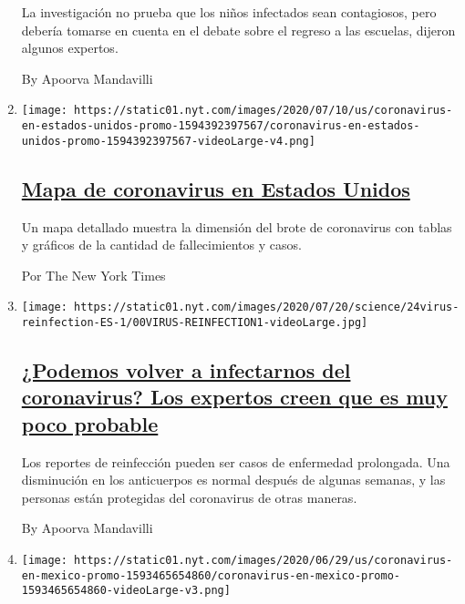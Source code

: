 \begin{enumerate}
  La investigación no prueba que los niños infectados sean contagiosos,
  pero debería tomarse en cuenta en el debate sobre el regreso a las
  escuelas, dijeron algunos expertos.

  By Apoorva Mandavilli
\item
  \texttt{[image: https://static01.nyt.com/images/2020/07/10/us/coronavirus-en-estados-unidos-promo-1594392397567/coronavirus-en-estados-unidos-promo-1594392397567-videoLarge-v4.png]}

  \hypertarget{mapa-de-coronavirus-en-estados-unidos}{%
  \subsection{\texorpdfstring{\href{/es/interactive/2020/espanol/mundo/coronavirus-en-estados-unidos.html}{Mapa
  de coronavirus en Estados
  Unidos}}{Mapa de coronavirus en Estados Unidos}}\label{mapa-de-coronavirus-en-estados-unidos}}

  Un mapa detallado muestra la dimensión del brote de coronavirus con
  tablas y gráficos de la cantidad de fallecimientos y casos.

  Por The New York Times
\item
  \texttt{[image: https://static01.nyt.com/images/2020/07/20/science/24virus-reinfection-ES-1/00VIRUS-REINFECTION1-videoLarge.jpg]}

  \hypertarget{podemos-volver-a-infectarnos-del-coronavirus-los-expertos-creen-que-es-muy-poco-probable}{%
  \subsection{\texorpdfstring{\href{/es/2020/07/24/espanol/ciencia-y-tecnologia/reinfeccion-coronavirus.html}{¿Podemos
  volver a infectarnos del coronavirus? Los expertos creen que es muy
  poco
  probable}}{¿Podemos volver a infectarnos del coronavirus? Los expertos creen que es muy poco probable}}\label{podemos-volver-a-infectarnos-del-coronavirus-los-expertos-creen-que-es-muy-poco-probable}}

  Los reportes de reinfección pueden ser casos de enfermedad prolongada.
  Una disminución en los anticuerpos es normal después de algunas
  semanas, y las personas están protegidas del coronavirus de otras
  maneras.

  By Apoorva Mandavilli
\item
  \texttt{[image: https://static01.nyt.com/images/2020/06/29/us/coronavirus-en-mexico-promo-1593465654860/coronavirus-en-mexico-promo-1593465654860-videoLarge-v3.png]}


\end{enumerate}

